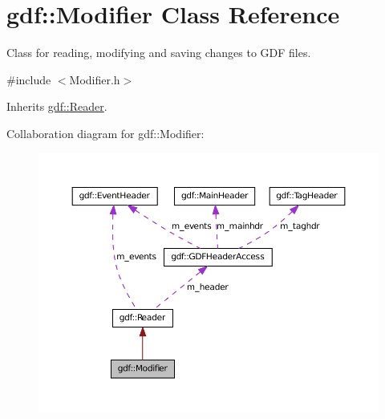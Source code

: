 \hypertarget{classgdf_1_1_modifier}{
\section{gdf::Modifier Class Reference}
\label{classgdf_1_1_modifier}
}


Class for reading, modifying and saving changes to GDF files.  




{\ttfamily \#include $<$Modifier.h$>$}



Inherits \hyperlink{classgdf_1_1_reader}{gdf::Reader}.



Collaboration diagram for gdf::Modifier:
\nopagebreak
\begin{figure}[H]
\begin{center}
\leavevmode
\includegraphics[width=400pt]{classgdf_1_1_modifier__coll__graph}
\end{center}
\end{figure}
